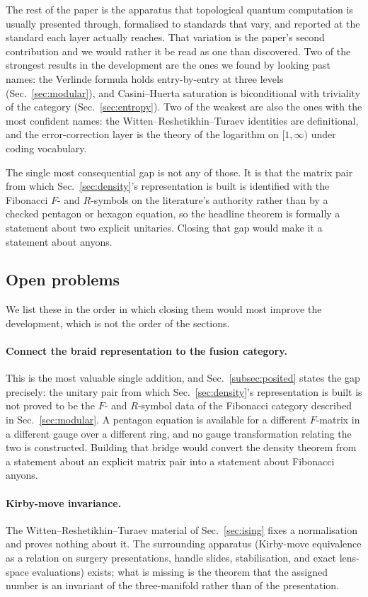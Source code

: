 \documentclass[aps,prx,nofootinbib,superscriptaddress,12pt]{revtex4-2}
\begin{document}
The rest of the paper is the apparatus that topological quantum
computation is usually presented through, formalised to standards that
vary, and reported at the standard each layer actually reaches. That
variation is the paper's second contribution and we would rather it be
read as one than discovered. Two of the strongest results in the
development are the ones we found by looking past names: the Verlinde
formula holds entry-by-entry at three levels
(Sec.~\ref{sec:modular}), and Casini--Huerta saturation is
biconditional with triviality of the category
(Sec.~\ref{sec:entropy}). Two of the weakest are also the ones with the
most confident names: the Witten--Reshetikhin--Turaev identities are
definitional, and the error-correction layer is the theory of the
logarithm on $[1,\infty)$ under coding vocabulary.

The single most consequential gap is not any of those. It is that the
matrix pair from which Sec.~\ref{sec:density}'s representation is built
is identified with the Fibonacci $F$- and $R$-symbols on the
literature's authority rather than by a checked pentagon or hexagon
equation, so the headline theorem is formally a statement about two
explicit unitaries. Closing that gap would make it a statement about
anyons.

\subsection{Open problems}

We list these in the order in which closing them would most improve the
development, which is not the order of the sections.

\paragraph{Connect the braid representation to the fusion category.}
This is the most valuable single addition, and Sec.~\ref{subsec:posited}
states the gap precisely: the unitary pair from which
Sec.~\ref{sec:density}'s representation is built is not proved to be the
$F$- and $R$-symbol data of the Fibonacci category described in
Sec.~\ref{sec:modular}. A pentagon equation is available for a different
$F$-matrix in a different gauge over a different ring, and no gauge
transformation relating the two is constructed. Building that bridge
would convert the density theorem from a statement about an explicit
matrix pair into a statement about Fibonacci anyons.

\paragraph{Kirby-move invariance.}
The Witten--Reshetikhin--Turaev material of Sec.~\ref{sec:ising} fixes a
normalisation and proves nothing about it. The surrounding
apparatus (Kirby-move equivalence as a relation on surgery
presentations, handle slides, stabilisation, and exact lens-space
evaluations) exists; what is missing is the theorem that the assigned
number is an invariant of the three-manifold rather than of the
presentation.
\end{document}
